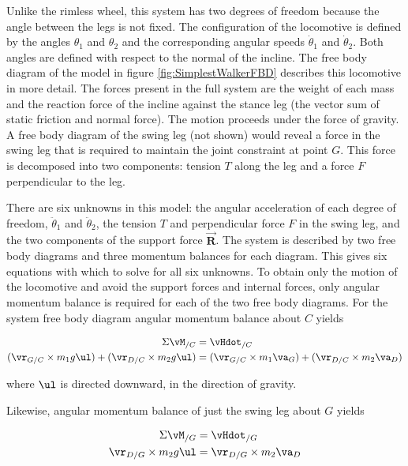Unlike the rimless wheel, this system has two degrees of freedom because the angle between the legs is not fixed. The configuration of the locomotive is defined by the angles $\theta_1$ and $\theta_2$ and the corresponding angular speeds $\dot{\theta}_1$ and $\dot{\theta}_2$. Both angles are defined with respect to the normal of the incline. The free body diagram of the model in figure \ref{fig:SimplestWalkerFBD} describes this locomotive in more detail. The forces present in the full system are the weight of each mass and the reaction force of the incline against the stance leg (the vector sum of static friction and normal force). The motion proceeds under the force of gravity. A free body diagram of the swing leg (not shown) would reveal a force in the swing leg that is required to maintain the joint constraint at point $G$. This force is decomposed into two components: tension $T$ along the leg and a force $F$ perpendicular to the leg. 

There are six unknowns in this model: the angular acceleration of each degree of freedom, $\ddot{\theta}_{1}$ and $\ddot{\theta}_{2}$, the tension $T$ and perpendicular force $F$ in the swing leg, and the two components of the support force $\vec{\mathbf{R}}$. The system is described by two free body diagrams and three momentum balances for each diagram. This gives six equations with which to solve for all six unknowns. To obtain only the motion of the locomotive and avoid the support forces and internal forces, only angular momentum balance is required for each of the two free body diagrams. For the system free body diagram angular momentum balance about $C$ yields

\begin{align}
\Sigma \vM_{/C} &= \vHdot_{/C} \notag \\
(\vr_{G/C} \times m_{1} g  \ul ) + (\vr_{D/C} \times m_{2} g  \ul ) &= (\vr_{G/C} \times m_{1} \va_{G}) + (\vr_{D/C} \times m_{2} \va_{D})
\label{eq:SimplestWalkerAMB1}
\end{align}

where $ \ul $ is directed downward, in the direction of gravity.

Likewise, angular momentum balance of just the swing leg about $G$ yields

\begin{align}
\Sigma \vM_{/G} &= \vHdot_{/G} \notag \\
\vr_{D/G} \times m_{2} g  \ul  &= \vr_{D/G} \times m_{2} \va_{D}
\label{eq:SimplestWalkerAMB2}
\end{align}

